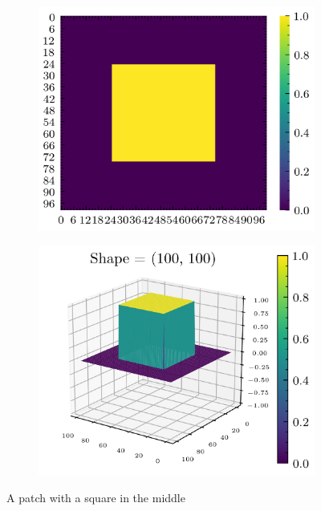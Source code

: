 \documentclass[../document.tex]{subfiles}
\begin{document}
\begin{figure}[H]
    \begin{subfigure}[b]{0.5\textwidth}
        \includegraphics[width=\textwidth]{../img/data-aug/2d/square-middle.png}
    \end{subfigure}
    \begin{subfigure}[b]{0.5\textwidth}
        \includegraphics[width=\textwidth]{../img/data-aug/square-middle.png}
    \end{subfigure}    
\label{fig: square-patch}
\caption{A patch with a square in the middle}    
\end{figure}
\end{document}
